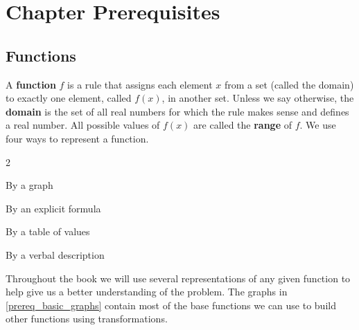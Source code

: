 \section{Chapter Prerequisites}\label{limits_prereq}\thispagestyle{fancy}

\prereqIntro

\subsection{Functions}

A \textbf{function} $f$ is a rule that assigns each element $x$ from a set (called the domain) to exactly one element, called $f(x)$, in another set. Unless we say otherwise, the \textbf{domain} is the set of all real numbers for which the rule makes sense and defines a real number. All possible values of $f(x)$ are called the \textbf{range} of $f$. We use four ways to represent a function.
\begin{itemize}
\begin{multicols}{2}
\item By a graph
\item By an explicit formula
\item By a table of values
\item By a verbal description
\end{multicols}
\end{itemize}

Throughout the book we will use several representations of any given function to help give us a better understanding of the problem. The graphs in \autoref{prereq_basic_graphs} contain most of the base functions we can use to build other functions using transformations.

